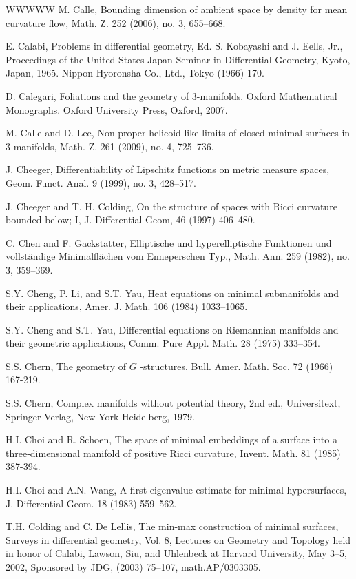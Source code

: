 \begin{thebibliography}{WWWWW}
 M. Calle, Bounding dimension of ambient space by density for mean curvature flow, Math. Z. 252 (2006), no. 3, 655–668.

 E. Calabi, Problems in differential geometry, Ed. S. Kobayashi and J. Eells, Jr., Proceedings of the United States-Japan Seminar in Differential Geometry, Kyoto, Japan, 1965. Nippon Hyoronsha Co., Ltd., Tokyo (1966) 170.

 D. Calegari, Foliations and the geometry of 3-manifolds. Oxford Mathematical Monographs. Oxford University Press, Oxford, 2007.

 M. Calle and D. Lee, Non-proper helicoid-like limits of closed minimal surfaces in 3-manifolds, Math. Z. 261 (2009), no. 4, 725–736.

 J. Cheeger, Differentiability of Lipschitz functions on metric measure spaces, Geom. Funct. Anal. 9 (1999), no. 3, 428–517.

 J. Cheeger and T. H. Colding, On the structure of spaces with Ricci curvature bounded below; I, J. Differential Geom, 46 (1997) 406–480.

 C. Chen and F. Gackstatter, Elliptische und hyperelliptische Funktionen und vollständige Minimalflächen vom Enneperschen Typ., Math. Ann. 259 (1982), no. 3, 359–369.

 S.Y. Cheng, P. Li, and S.T. Yau, Heat equations on minimal submanifolds and their applications, Amer. J. Math. 106 (1984) 1033–1065.

 S.Y. Cheng and S.T. Yau, Differential equations on Riemannian manifolds and their geometric applications, Comm. Pure Appl. Math. 28 (1975) 333–354.

 S.S. Chern, The geometry of $G$ -structures, Bull. Amer. Math. Soc. 72 (1966) 167-219.

 S.S. Chern, Complex manifolds without potential theory, 2nd ed., Universitext, Springer-Verlag, New York-Heidelberg, 1979.

 H.I. Choi and R. Schoen, The space of minimal embeddings of a surface into a three-dimensional manifold of positive Ricci curvature, Invent. Math. 81 (1985) 387-394.

 H.I. Choi and A.N. Wang, A first eigenvalue estimate for minimal hypersurfaces, J. Differential Geom. 18 (1983) 559–562.

 T.H. Colding and C. De Lellis, The min-max construction of minimal surfaces, Surveys in differential geometry, Vol. 8, Lectures on Geometry and Topology held in honor of Calabi, Lawson, Siu, and Uhlenbeck at Harvard University, May 3–5, 2002, Sponsored by JDG, (2003) 75–107, math.AP/0303305.


\end{thebibliography}
